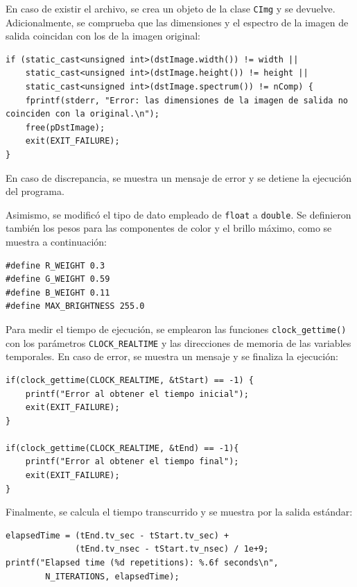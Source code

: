 \documentclass[11pt,a4paper]{article}
\begin{document}
En caso de existir el archivo, se crea un objeto de la clase \texttt{CImg} y se devuelve. Adicionalmente, se comprueba que las dimensiones y el espectro de la imagen de salida coincidan con los de la imagen original:

\begin{lstlisting}[style=cppStyle]
if (static_cast<unsigned int>(dstImage.width()) != width || 
    static_cast<unsigned int>(dstImage.height()) != height || 
    static_cast<unsigned int>(dstImage.spectrum()) != nComp) {
    fprintf(stderr, "Error: las dimensiones de la imagen de salida no coinciden con la original.\n");
    free(pDstImage);
    exit(EXIT_FAILURE);
}
\end{lstlisting}

En caso de discrepancia, se muestra un mensaje de error y se detiene la ejecución del programa.\vspace{2ex}

Asimismo, se modificó el tipo de dato empleado de \texttt{float} a \texttt{double}. Se definieron también los pesos para las componentes de color y el brillo máximo, como se muestra a continuación:

\begin{lstlisting}[style=cppStyle]
#define R_WEIGHT 0.3
#define G_WEIGHT 0.59
#define B_WEIGHT 0.11
#define MAX_BRIGHTNESS 255.0
\end{lstlisting}

\noindent Para medir el tiempo de ejecución, se emplearon las funciones \texttt{clock\_gettime()} con los parámetros \texttt{CLOCK\_REALTIME} y las direcciones de memoria de las variables temporales. En caso de error, se muestra un mensaje y se finaliza la ejecución:

\begin{lstlisting}[style=cppStyle]
if(clock_gettime(CLOCK_REALTIME, &tStart) == -1) {
    printf("Error al obtener el tiempo inicial");
    exit(EXIT_FAILURE);
}

if(clock_gettime(CLOCK_REALTIME, &tEnd) == -1){
    printf("Error al obtener el tiempo final");
    exit(EXIT_FAILURE);
}
\end{lstlisting}

Finalmente, se calcula el tiempo transcurrido y se muestra por la salida estándar:
\begin{lstlisting}[style=cppStyle]
elapsedTime = (tEnd.tv_sec - tStart.tv_sec) + 
              (tEnd.tv_nsec - tStart.tv_nsec) / 1e+9;
printf("Elapsed time (%d repetitions): %.6f seconds\n", 
        N_ITERATIONS, elapsedTime);
\end{lstlisting}
\end{document}
